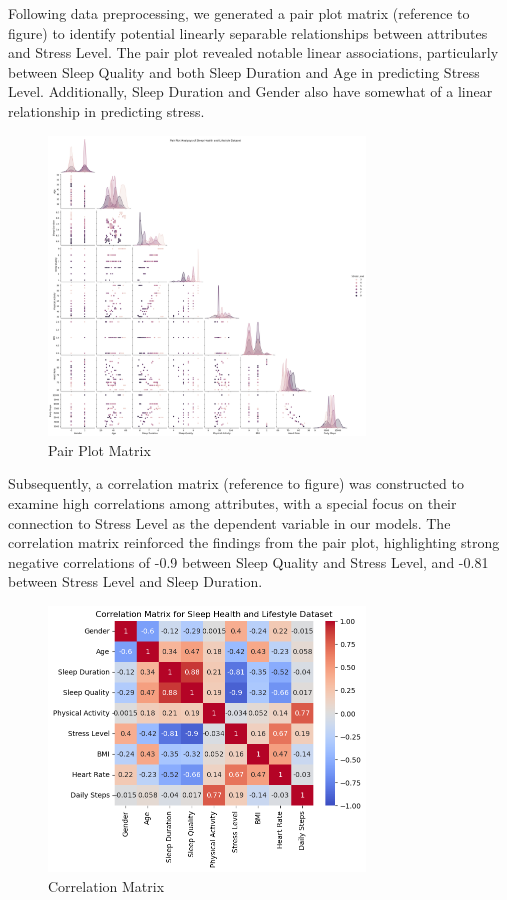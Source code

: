\documentclass[11pt, letterpaper]{article}
\begin{document}
    Following data preprocessing, we generated a pair plot matrix (reference to figure) to identify potential linearly separable relationships between attributes and Stress Level. The pair plot revealed notable linear associations, particularly between Sleep Quality and both Sleep Duration and Age in predicting Stress Level. Additionally, Sleep Duration and Gender also have somewhat of a linear relationship in predicting stress. 

    \begin{figure}[H]
        \centering
        \includegraphics[width=0.75\textwidth]{pairplot.png}
        \caption{Pair Plot Matrix}
        \label{fig:pairplot}
    \end{figure}

    Subsequently, a correlation matrix (reference to figure) was constructed to examine high correlations among attributes, with a special focus on their connection to Stress Level as the dependent variable in our models. The correlation matrix reinforced the findings from the pair plot, highlighting strong negative correlations of -0.9 between Sleep Quality and Stress Level, and -0.81 between Stress Level and Sleep Duration.

    \begin{figure}[H]
        \centering
        \includegraphics[width=0.75\textwidth]{correlation.png}
        \caption{Correlation Matrix}
        \label{fig:correlation}
    \end{figure}
\end{document}
